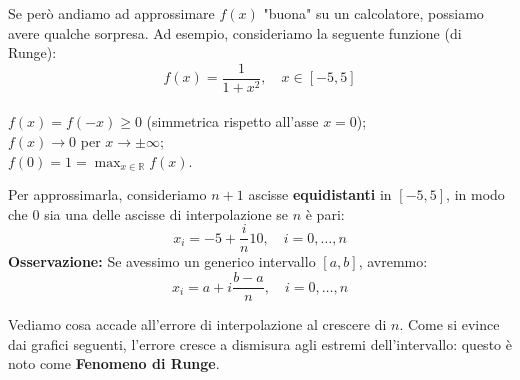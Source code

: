 Se però andiamo ad approssimare $f(x)$ "buona" su un calcolatore, possiamo avere qualche sorpresa.
Ad esempio, consideriamo la seguente funzione (di Runge):
$$f(x) = \frac{1}{1+x^2}, \quad x \in [-5,5]$$ \\
$f(x) = f(-x) \geq 0$ (simmetrica rispetto all'asse $x=0$); \\
$f(x) \to 0$ per $x \to \pm \infty$; \\
$f(0) = 1 = \max_{x \in \mathbb{R}} f(x)$.

\begin{center}
\end{center}

Per approssimarla, consideriamo $n+1$ ascisse \textbf{equidistanti} in $[-5,5]$, in modo che $0$ sia una delle ascisse di interpolazione se $n$ è pari:
$$x_i = -5 + \frac{i}{n} 10, \quad i=0, \dots, n$$
\textbf{Osservazione:} Se avessimo un generico intervallo $[a,b]$, avremmo:
$$x_i = a + i \frac{b-a}{n}, \quad i=0, \dots, n$$

Vediamo cosa accade all'errore di interpolazione al crescere di $n$. Come si evince dai grafici seguenti, l'errore cresce a dismisura agli estremi dell'intervallo: questo è noto come \textbf{Fenomeno di Runge}.

